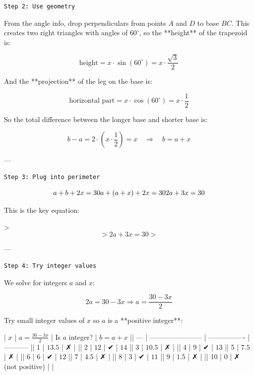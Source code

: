 \begin{enumerate}
 \begin{verbatim}
Step 2: Use geometry
\end{verbatim}

From the angle info, drop perpendiculars from points $A$ and $D$ to base $BC$. This creates two right triangles with angles of $60^\circ$, so the **height** of the trapezoid is:

 
 \[\text{height} = x \cdot \sin(60^\circ) = x \cdot \frac{\sqrt{3}}{2}\]

 And the **projection** of the leg on the base is:

 
 \[\text{horizontal part} = x \cdot \cos(60^\circ) = x \cdot \frac{1}{2}\]

 So the total difference between the longer base and shorter base is:

 
 \[b - a = 2 \cdot \left(x \cdot \frac{1}{2}\right) = x \quad \Rightarrow \quad b = a + x\]

 ---

 \begin{verbatim}
Step 3: Plug into perimeter
\end{verbatim}


 \[a + b + 2x = 30 \\ a + (a + x) + 2x = 30 \\ 2a + 3x = 30\]

 This is the key equation:

 > 
 \[> \boxed{2a + 3x = 30} >\]

 ---

 \begin{verbatim}
Step 4: Try integer values
\end{verbatim}

We solve for integers $a$ and $x$:

 
 \[2a = 30 - 3x \Rightarrow a = \frac{30 - 3x}{2}\]

 Try small integer values of $x$ so $a$ is a **positive integer**:

 | $x$ | $a = \frac{30 - 3x}{2}$ | Is $a$ integer?  | $b = a + x$ || --- | ----------------------- | ---------------- | ----------- || 1   | $13.5$                  | ✗                |             || 2   | $12$                    | ✔                | $14$        || 3   | $10.5$                  | ✗                |             || 4   | $9$                     | ✔                | $13$        || 5   | $7.5$                   | ✗                |             || 6   | $6$                     | ✔                | $12$        || 7   | $4.5$                   | ✗                |             || 8   | $3$                     | ✔                | $11$        || 9   | $1.5$                   | ✗                |             || 10  | $0$                     | ✗ (not positive) |             |


\end{enumerate}
